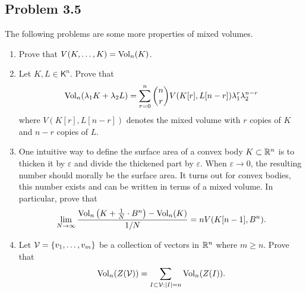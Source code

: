\documentclass[12pt]{article}
\begin{document}
\newpage 

\subsection{Problem 3.5}

\begin{problem} \label{problem-3.5}
	The following problems are some more properties of mixed volumes. 
    \begin{enumerate}[label = (\alph*)]
        \item Prove that $V(K, \ldots, K) = \operatorname{Vol}_n(K)$. 
        \item Let $K, L \in \mathsf{K}^n$. Prove that 
        \[
            \operatorname{Vol}_n(\lambda_1 K + \lambda_2 L) = \sum_{r = 0}^n \binom{n}{r} V(K[r], L[n-r]) \lambda_1^r \lambda_2^{n-r}    
        \]
        where $V(K[r], L[n-r])$ denotes the mixed volume with $r$ copies of $K$ and $n-r$ copies of $L$. 
        \item One intuitive way to define the surface area of a convex body $K \subset \mathbb{R}^n$ is to thicken it by $\varepsilon$ and divide the thickened part by $\varepsilon$. When $\varepsilon \to 0$, the resulting number should morally be the surface area. It turns out for convex bodies, this number exists and can be written in terms of a mixed volume. In particular, prove that  
        \[
            \lim_{N \to \infty} \frac{\operatorname{Vol}_n \left (K + \frac{1}{N} \cdot B^n \right ) - \operatorname{Vol}_n(K)}{1/N} = n V(K[n-1], B^n).
        \]
        \item Let $\mathcal{V} = \{v_1, \ldots, v_m\}$ be a collection of vectors in $\mathbb{R}^n$ where $m \geq n$. Prove that 
        \[
            \operatorname{Vol}_n(Z(\mathcal{V})) = \sum_{I \subset \mathcal{V} : |I| = n} \operatorname{Vol}_n(Z(I)).
        \] 
    \end{enumerate}
\end{problem}
\end{document}
